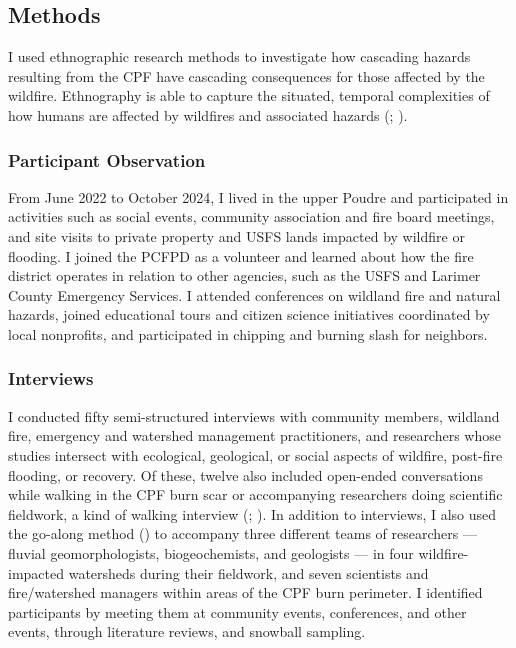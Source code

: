 \documentclass[
]{article}
\begin{document}
\subsection{Methods}\label{methods}

I used ethnographic research methods to investigate how cascading hazards resulting from the CPF have cascading consequences for those affected by the wildfire. Ethnography is able to capture the situated, temporal complexities of how humans are affected by wildfires and associated hazards (; ).

\subsubsection{Participant Observation}\label{participant-observation}

From June 2022 to October 2024, I lived in the upper Poudre and participated in activities such as social events, community association and fire board meetings, and site visits to private property and USFS lands impacted by wildfire or flooding. I joined the PCFPD as a volunteer and learned about how the fire district operates in relation to other agencies, such as the USFS and Larimer County Emergency Services. I attended conferences on wildland fire and natural hazards, joined educational tours and citizen science initiatives coordinated by local nonprofits, and participated in chipping and burning slash for neighbors.

\subsubsection{Interviews}\label{interviews}

I conducted fifty semi-structured interviews with community members, wildland fire, emergency and watershed management practitioners, and researchers whose studies intersect with ecological, geological, or social aspects of wildfire, post-fire flooding, or recovery. Of these, twelve also included open-ended conversations while walking in the CPF burn scar or accompanying researchers doing scientific fieldwork, a kind of walking interview (; ). In addition to interviews, I also used the go-along method () to accompany three different teams of researchers --- fluvial geomorphologists, biogeochemists, and geologists --- in four wildfire-impacted watersheds during their fieldwork, and seven scientists and fire/watershed managers within areas of the CPF burn perimeter. I identified participants by meeting them at community events, conferences, and other events, through literature reviews, and snowball sampling.
\end{document}
